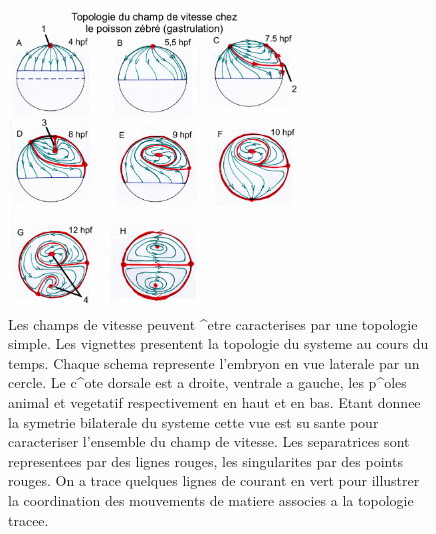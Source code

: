 \begin{figure}
\begin{center}
\includegraphics[width=0.7\textwidth]{../../images/Reconstruction/these_lombardot/p172_velocity_map_drawings.png}
\end{center}
\caption{Les champs de vitesse peuvent ^etre caracterises par une topologie simple. Les vignettes presentent la topologie du systeme au cours du temps. Chaque schema represente l'embryon en vue laterale par un cercle. Le c^ote dorsale est a droite, ventrale a gauche, les p^oles animal et vegetatif respectivement en haut et en bas. Etant donnee la symetrie bilaterale du systeme cette vue est susante pour caracteriser l'ensemble du champ de vitesse. Les separatrices sont representees par des lignes rouges, les singularites par des points rouges. On a trace quelques lignes de courant en vert pour illustrer la coordination des mouvements de matiere associes a la topologie tracee.}
\label{these_lombardot_p172_velocity_map_drawings}
\end{figure}
